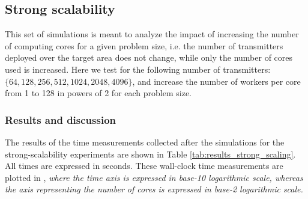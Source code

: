 \subsection{Strong scalability\label{sub:Strong-scalability}}

This set of simulations is meant to analyze the impact of increasing
the number of computing cores for a given problem size, i.e. the number
of transmitters deployed over the target area does not change, while
only the number of cores used is increased. Here we test for the following
number of transmitters: $\{64,128,256,512,1024,2048,4096\}$, and
increase the number of workers per core from 1 to 128 in powers of
2 for each problem size.


\subsubsection{Results and discussion}

The results of the time measurements collected after the simulations
for the strong-scalability experiments are shown in Table \ref{tab:results_strong_scaling}.
All times are expressed in seconds. These wall-clock time measurements
are plotted in , \textit{\emph{where
the time axis is expressed in base-10 logarithmic scale, whereas the
axis representing the number of cores is expressed in base-2 logarithmic
scale.}}

